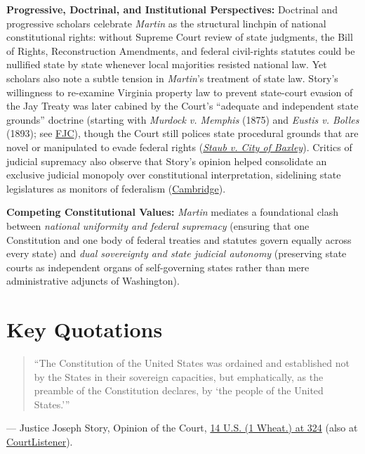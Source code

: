 \documentclass[12pt]{article}
\begin{document}
\textbf{Progressive, Doctrinal, and Institutional Perspectives:} Doctrinal and progressive scholars celebrate \textit{Martin} as the structural linchpin of national constitutional rights: without Supreme Court review of state judgments, the Bill of Rights, Reconstruction Amendments, and federal civil-rights statutes could be nullified state by state whenever local majorities resisted national law. Yet scholars also note a subtle tension in \textit{Martin}'s treatment of state law. Story's willingness to re-examine Virginia property law to prevent state-court evasion of the Jay Treaty was later cabined by the Court's ``adequate and independent state grounds'' doctrine (starting with \textit{Murdock v. Memphis} (1875) and \textit{Eustis v. Bolles} (1893); see \href{https://www.fjc.gov/history/cases/cases-that-shaped-the-federal-courts/martin-v-hunter-s-lessee}{FJC}), though the Court still polices state procedural grounds that are novel or manipulated to evade federal rights (\textit{\href{https://supreme.justia.com/cases/federal/us/355/313/}{Staub v. City of Baxley}}). Critics of judicial supremacy also observe that Story's opinion helped consolidate an exclusive judicial monopoly over constitutional interpretation, sidelining state legislatures as monitors of federalism (\href{https://www.cambridge.org/core/books/monitoring-american-federalism/state-challenges-to-the-supreme-courts-control-over-constitutional-interpretation/85539C2F1811467C31EF62DBD350C7D8}{Cambridge}).

\textbf{Competing Constitutional Values:} \textit{Martin} mediates a foundational clash between \textit{national uniformity and federal supremacy} (ensuring that one Constitution and one body of federal treaties and statutes govern equally across every state) and \textit{dual sovereignty and state judicial autonomy} (preserving state courts as independent organs of self-governing states rather than mere administrative adjuncts of Washington).

\section{Key Quotations}

\begin{quote}
``The Constitution of the United States was ordained and established not by the States in their sovereign capacities, but emphatically, as the preamble of the Constitution declares, by `the people of the United States.'''
\end{quote}
\noindent --- Justice Joseph Story, Opinion of the Court, \href{https://supreme.justia.com/cases/federal/us/14/304/}{14 U.S. (1 Wheat.) at 324} (also at \href{https://www.courtlistener.com/opinion/85160/martin-v-hunters-lessee/}{CourtListener}).
\end{document}
